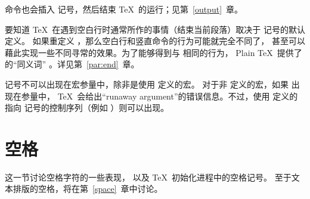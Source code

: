 \documentclass{book}
\begin{document}
 命令也会插入  记号，然后结束 \TeX\ 的运行；见第~\ref{output}~章。

要知道 \TeX\ 在遇到空白行时通常所作的事情（结束当前段落）取决于  记号的默认定义。
如果重定义 ，那么空白行和竖直命令的行为可能就完全不同了，
甚至可以藉此实现一些不同寻常的效果。为了能够得到与  相同的行为，
Plain \TeX\ 提供了  的“同义词” 。详见第~\ref{par:end}~章。

 记号不可以出现在宏参量中，除非是使用  定义的宏。
对于非  定义的宏，如果  出现在参量中，
\TeX\ 会给出“runaway argument”的错误信息。不过，使用 
定义的指向  记号的控制序列（例如 ）则可以出现。

\section{空格}

这一节讨论空格字符的一些表现，
以及 \TeX\ 初始化进程中的空格记号。
至于文本排版的空格，将在第~\ref{space}~章中讨论。


\end{document}
